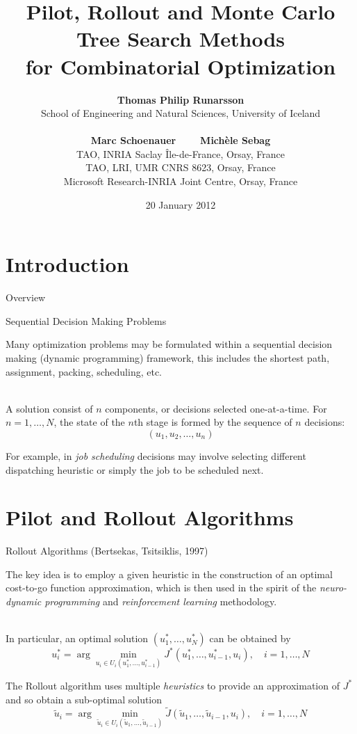 \documentclass[
	mode=present,
	paper=screen,
	orient=landscape,
	display=slides,
	style=simple
	]{powerdot}
\title{Pilot, Rollout and Monte Carlo Tree Search Methods\\ for Combinatorial Optimization}
\author{{\bf Thomas Philip Runarsson}\\
{School of Engineering and Natural Sciences, University of Iceland} \\ 
\ \\
{\bf Marc Schoenauer ~~~ Mich\`ele Sebag}\\
{TAO, INRIA Saclay Île-de-France, 
Orsay, France} \\ {TAO, LRI, UMR CNRS 8623, Orsay, France} \\ {Microsoft Research-INRIA Joint Centre, Orsay, 
France}}
\date{20 January 2012}
\begin{document}
\maketitle

\section[slide=false]{Introduction}
\begin{slide}[toc=,bm=]{Overview}
\tableofcontents[content=sections]
\end{slide}


\begin{slide}{Sequential Decision Making Problems}


Many optimization problems may be formulated within a sequential decision making (dynamic programming) framework, this 
includes the shortest path, assignment, packing, scheduling, etc.\\
\ \\
\pause

A solution consist of $n$ components, or decisions selected one-at-a-time. For $n=1,\ldots,N$, the state of the $n$th 
stage is formed by the sequence of $n$ decisions: 
$$(u_1,u_2,\ldots,u_n)$$

\pause

For example, in \emph{job scheduling} decisions may involve selecting different dispatching heuristic or simply the 
job to be 
scheduled next.



\end{slide}

\section[slide=false]{Pilot and Rollout Algorithms}

\begin{slide}{Rollout Algorithms (Bertsekas, Tsitsiklis, 1997)}

The key idea is to employ a given heuristic in the construction of an optimal cost-to-go
function approximation, which is then used in the spirit of the \emph{neuro-dynamic programming} and 
\emph{reinforcement learning} methodology.\\
\ \\
\pause

In particular, an optimal solution $(u_1^*,\ldots,u_N^*)$ can be obtained by
$$u_i^*=\arg\min_{u_i\in U_i(u_1^*,\ldots,u_{i-1}^*)}J^*(u_1^*,\ldots,u_{i-1}^*,u_i),\quad i=1,\ldots,N$$

\pause
The Rollout algorithm uses multiple \emph{heuristics} to provide an approximation of $J^*$ and so obtain a 
sub-optimal 
solution
$$\tilde{u}_i=\arg\min_{\tilde{u}_i\in 
U_i(\tilde{u}_1,\ldots,\tilde{u}_{i-1})}\tilde{J}(\tilde{u}_1,\ldots,\tilde{u}_{i-1},u_i),\quad i=1,\ldots,N$$


\end{slide}
\end{document}
